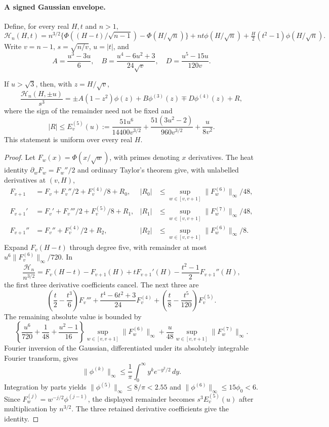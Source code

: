 \paragraph{A signed Gaussian envelope.}
Define, for every real $H,t$ and $n>1$,
\[
 \mathcal H_n(H,t)=n^{3/2}\{\Phi((H-t)/\sqrt{n-1})-
             \Phi(H/\sqrt n)\}
       +nt\phi(H/\sqrt n)+\tfrac H2(t^2-1)\phi(H/\sqrt n).
\]
Write $v=n-1$, $s=\sqrt{n/v}$, $u=|t|$, and
\[
 A=\frac{u^3-3u}{6},\quad B=\frac{u^4-6u^2+3}{24\sqrt v},
 \quad D=\frac{u^5-15u}{120v}.
\]
\begin{lemma}
If $u>\sqrt3$, then, with $z=H/\sqrt v$,
\[
 \frac{\mathcal H_n(H,\pm u)}{s^3}
 =\pm A(1-z^2)\phi(z)+B\phi^{(3)}(z)
                  \mp D\phi^{(4)}(z)+R,
\]
where the sign of the remainder need not be fixed and
\[
 |R|\le E^{(5)}_v(u):=
 \frac{51u^6}{14400v^{3/2}}
 +\frac{51(3u^2-2)}{960v^{3/2}}+\frac{u}{8v^2}.
\]
This statement is uniform over every real $H$.
\end{lemma}
\begin{proof}
Let $F_w(x)=\Phi(x/\sqrt w)$, with primes denoting $x$ derivatives.
The heat identity $\partial_w F_w=F_w''/2$ and ordinary Taylor's theorem
give, with unlabelled derivatives at $(v,H)$,
\begin{align*}
 F_{v+1}&=F_v+F_v''/2+F_v^{(4)}/8+R_0,
 &|R_0|&\le\sup_{w\in[v,v+1]}\|F_w^{(6)}\|_\infty/48,\\
 F_{v+1}'&=F_v'+F_v'''/2+F_v^{(5)}/8+R_1,
 &|R_1|&\le\sup_{w\in[v,v+1]}\|F_w^{(7)}\|_\infty/48,\\
 F_{v+1}''&=F_v''+F_v^{(4)}/2+R_2,
 &|R_2|&\le\sup_{w\in[v,v+1]}\|F_w^{(6)}\|_\infty/8.
\end{align*}
Expand $F_v(H-t)$ through degree five, with remainder at most
$u^6\|F_v^{(6)}\|_\infty/720$. In
\[
 \frac{\mathcal H_n}{n^{3/2}}=
 F_v(H-t)-F_{v+1}(H)+tF_{v+1}'(H)
             -\frac{t^2-1}{2}F_{v+1}''(H),
\]
the first three derivative coefficients cancel. The next three are
\[
 \left(\frac t2-\frac{t^3}6\right)F_v'''
 +\frac{t^4-6t^2+3}{24}F_v^{(4)}
 +\left(\frac t8-\frac{t^5}{120}\right)F_v^{(5)}.
\]
The remaining absolute value is bounded by
\[
 \left\{\frac{u^6}{720}+\frac1{48}+\frac{u^2-1}{16}\right\}
       \sup_{w\in[v,v+1]}\|F_w^{(6)}\|_\infty
 +\frac u{48}\sup_{w\in[v,v+1]}\|F_w^{(7)}\|_\infty.
\]
Fourier inversion of the Gaussian, differentiated under its absolutely
integrable Fourier transform, gives
\[
 \|\phi^{(k)}\|_\infty
 \le\frac1\pi\int_0^\infty y^k e^{-y^2/2}\,dy.
\]
Integration by parts yields
$\|\phi^{(5)}\|_\infty\le8/\pi<2.55$ and
$\|\phi^{(6)}\|_\infty\le15\phi_0<6$.
Since $F_w^{(j)}=w^{-j/2}\phi^{(j-1)}$, the displayed remainder
becomes $s^3E^{(5)}_v(u)$ after multiplication by $n^{3/2}$.
The three retained derivative coefficients give the identity.
\end{proof}

